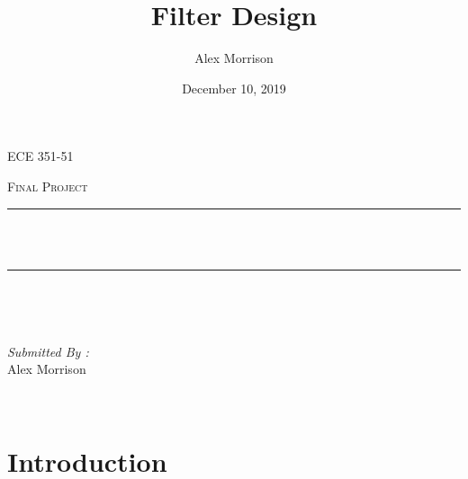 \documentclass[12pt]{report}
\title{Filter Design}
\author{ Alex Morrison}
\date{December 10, 2019}
\makeatletter
\let\thetitle\@title
\makeatother
\begin{document}

\begin{titlepage}
	\centering
    \vspace*{0.5 cm}
\begin{center}    \textsc{\Large ECE 351-51}\\[2.0 cm]	\end{center}%
	\textsc{\Large  Final Project}\\[0.5 cm]				%
	\rule{\linewidth}{0.2 mm} \\[0.4 cm]
	{ \huge \bfseries \thetitle}\\
	\rule{\linewidth}{0.2 mm} \\[1.5 cm]
	
	\begin{minipage}{0.4\textwidth}
		\begin{flushleft} \large
			\end{flushleft}
			\end{minipage}~
			\begin{minipage}{0.4\textwidth}
            
			\begin{flushright} \large
			\emph{Submitted By :} \\
			Alex Morrison  
		\end{flushright}
           
	\end{minipage}\\[2 cm]
	

    
    
    
    
	
\end{titlepage}


\tableofcontents
\pagebreak

\renewcommand{\thesection}{\arabic{section}}
\section{Introduction}
\end{document}
